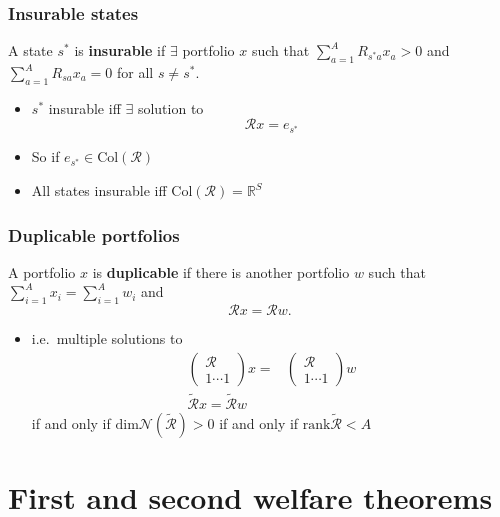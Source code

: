 \documentclass[compress]{beamer}
\def\R{\mathbb{R}}
\newcommand{\rank}{\mathrm{rank}}
\newcommand{\col}{\mathrm{Col}}
\renewcommand{\dim}{\mathrm{dim}}
\begin{document}
\begin{frame}\frametitle{Insurable states}
  \begin{definition}
    A state $s^*$ is \textbf{insurable} if $\exists$ portfolio $x$ such
    that $\sum_{a=1}^A R_{s^*a} x_a > 0$ and $\sum_{a=1}^A R_{sa} x_a =
    0$ for all $s \neq s^*$. 
  \end{definition}
  \begin{itemize}
  \item $s^*$ insurable iff $\exists$ solution to
    \[ \mathcal{R}x = e_{s^*} \] 
  \item So if $e_{s^*} \in \col(\mathcal{R})$
  \item All states insurable iff $\col(\mathcal{R}) = \R^S$
  \end{itemize}
\end{frame}

\begin{frame}
  \frametitle{Duplicable portfolios}
  \begin{definition}
    A portfolio $x$ is \textbf{duplicable} if there is
    another portfolio $w$ such that $\sum_{i=1}^A x_i = \sum_{i=1}^A w_i
    $ and 
    \[ \mathcal{R} x = \mathcal{R} w. \]
  \end{definition}
  \begin{itemize}
  \item i.e.\  multiple solutions to
    \begin{align*}
      \begin{pmatrix} \mathcal{R} \\ 1 \cdots 1 \end{pmatrix} x 
      = & \begin{pmatrix} \mathcal{R} \\ 1 \cdots 1 \end{pmatrix} w
      \\
      \widetilde{\mathcal{R}} x = \widetilde{\mathcal{R}} w
    \end{align*}
    if and only if $\dim \mathcal{N}(\widetilde{\mathcal{R}})> 0$ if and
    only if $\rank \widetilde{\mathcal{R}} < A$
  \end{itemize}
\end{frame}

\section{First and second welfare theorems}
\end{document}

